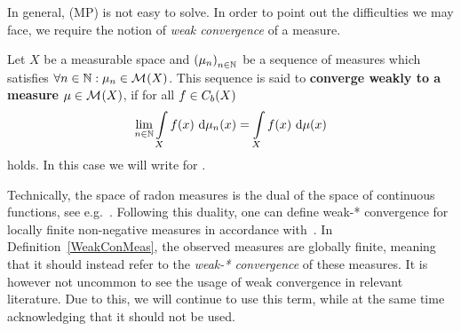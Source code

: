 
In general, (MP) is not easy to solve. In order to point out the difficulties we may face, we require the notion of \textit{weak convergence} of a measure.



\begin{definition}\label{WeakConMeas}
	Let $X$ be a measurable space and ${(\mu_n)}_{\NinN}$ be a sequence of measures which satisfies $\forall \NinN: \mu_n \in \M{X}$. This sequence is said to \textbf{converge weakly to a measure} $\mu \in \M{X}$, if for all $f \in \CF[b]{X}$ 
	\[ \lim\limits_{\NinN} \int\limits_X f(x)~\Dx{\mu_n} = \int\limits_X f(x)~\Dx{\mu} \]
	holds. In this case we will write  for \Ninf{}.
\end{definition}

\begin{remark}
	Technically, the space of radon measures is the dual of the space of continuous functions, see e.g.\ \cite[Section~4]{Kapl1957}. Following this duality, one can define weak-* convergence for locally finite non-negative measures in accordance with\ \cite[Definition~2.4]{Cami2008}. In Definition~\ref{WeakConMeas}, the observed measures are globally finite, meaning that it should instead refer to the \textit{weak-* convergence} of these measures. It is however not uncommon to see the usage of weak convergence in relevant literature. Due to this, we will continue to use this term, while at the same time acknowledging that it should not be used.
\end{remark}

